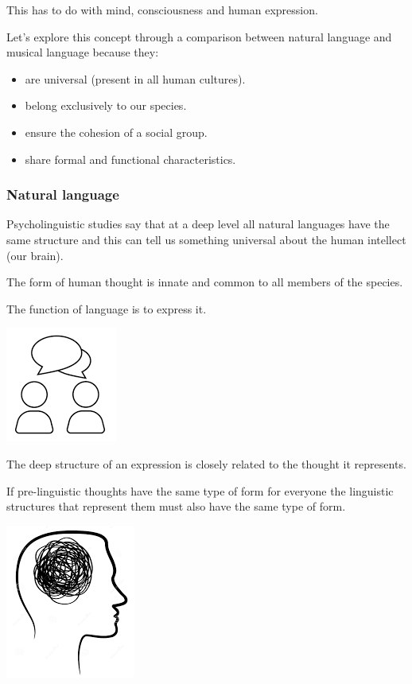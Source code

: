 This has to do with mind, consciousness and human expression.

Let's explore this concept through a comparison between natural language and musical language because they: 
\begin{itemize}
\tightlist
\item are universal (present in all human cultures). 
\item belong exclusively to our species. 
\item ensure the cohesion of a social group. 
\item share formal and functional characteristics.
\end{itemize}

\subsubsection{Natural language}\label{natural-language}

Psycholinguistic studies say that at a deep level all natural languages have the same structure and this can tell us something universal about the human intellect (our brain).

The form of human thought is innate and common to all members of the species.

The function of language is to express it.

\begin{center}
\includegraphics[scale=0.5]{../img/linguaggio.png}
\end{center}

The deep structure of an expression is closely related to the thought it represents.

If pre-linguistic thoughts have the same type of form for everyone the linguistic structures that represent them must also have the same type of form.

\begin{center}
\includegraphics[scale=0.4]{../img/prelinguistico.png}
\end{center}

